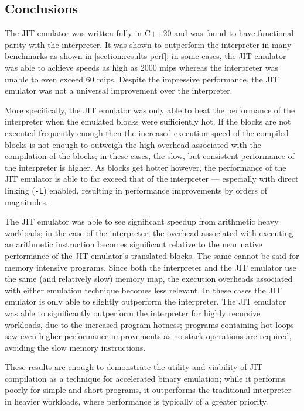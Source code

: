 \subsection{Conclusions}

The JIT emulator was written fully in C++20 and was found to have functional parity with the interpreter. It was shown to outperform the interpreter in many benchmarks as shown in \autoref{section:results-perf}; in some cases, the JIT emulator was able to achieve speeds as high as 2000 mips whereas the interpreter was unable to even exceed 60 mips. Despite the impressive performance, the JIT emulator was not a universal improvement over the interpreter.

More specifically, the JIT emulator was only able to beat the performance of the interpreter when the emulated blocks were sufficiently hot. If the blocks are not executed frequently enough then the increased execution speed of the compiled blocks is not enough to outweigh the high overhead associated with the compilation of the blocks; in these cases, the slow, but consistent performance of the interpreter is higher. As blocks get hotter however, the performance of the JIT emulator is able to far exceed that of the interpreter — especially with direct linking (\texttt{-L}) enabled, resulting in performance improvements by orders of magnitudes.

The JIT emulator was able to see significant speedup from arithmetic heavy workloads; in the case of the interpreter, the overhead associated with executing an arithmetic instruction becomes significant relative to the near native performance of the JIT emulator's translated blocks. The same cannot be said for memory intensive programs. Since both the interpreter and the JIT emulator use the same (and relatively slow) memory map, the execution overheads associated with either emulation technique becomes less relevant. In these cases the JIT emulator is only able to slightly outperform the interpreter. The JIT emulator was able to significantly outperform the interpreter for highly recursive workloads, due to the increased program hotness; programs containing hot loops saw even higher performance improvements as no stack operations are required, avoiding the slow memory instructions.

These results are enough to demonstrate the utility and viability of JIT compilation as a technique for accelerated binary emulation; while it performs poorly for simple and short programs, it outperforms the traditional interpreter in heavier workloads, where performance is typically of a greater priority.

